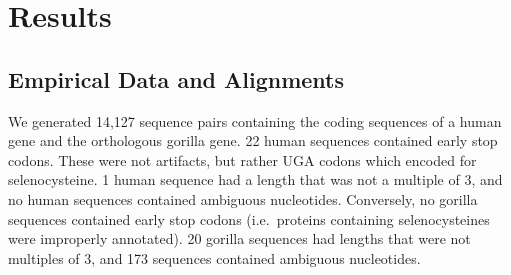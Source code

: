 \documentclass[12pt,letterpaper]{article}
\begin{document}



\section*{Results}

\subsection*{Empirical Data and Alignments}

We generated 14,127 sequence pairs containing the coding sequences of a human gene and the orthologous gorilla gene. 22 human sequences contained early stop codons. These were not artifacts, but rather UGA codons which encoded for selenocysteine. 1 human sequence had a length that was not a multiple of 3, and no human sequences contained ambiguous nucleotides. Conversely, no gorilla sequences contained early stop codons (i.e.\ proteins containing selenocysteines were improperly annotated). 20 gorilla sequences had lengths that were not multiples of 3, and 173 sequences contained ambiguous nucleotides.
\end{document}
